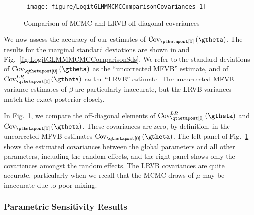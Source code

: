 \documentclass{article}\usepackage[]{graphicx}\usepackage[]{color}
\newenvironment{knitrout}{}{}
\theoremstyle{definition}
\theoremstyle{plain}
\theoremstyle{plain}
\theoremstyle{plain}
\theoremstyle{definition}
\theoremstyle{plain}
\theoremstyle{plain}
\newcommand{\fig}[1]{Fig.~\ref{fig:#1}}
\begin{document}
\begin{knitrout}
\color{fgcolor}\begin{figure}[t]

{\centering \texttt{[image: figure/LogitGLMMMCMCComparisonCovariances-1]} 

}

\caption[Comparison of MCMC and LRVB off-diagonal covariances]{Comparison of MCMC and LRVB off-diagonal covariances}\label{fig:LogitGLMMMCMCComparisonCovariances}
\end{figure}


\end{knitrout}
We now assess the accuracy of our estimates of $\pcov\left(\gtheta\right)$.
The results for the marginal standard deviations are shown in 
and \fig{LogitGLMMMCMCComparisonSds}. We refer to the standard deviations
of $\qcov\left(\gtheta\right)$ as the ``uncorrected MFVB'' estimate,
and of $\lrvbcov\left(\gtheta\right)$ as the ``LRVB'' estimate.
The uncorrected MFVB variance estimates of $\beta$ are particularly
inaccurate, but the LRVB variances match the exact posterior closely.

In \fig{LogitGLMMMCMCComparisonCovariances}, we compare the off-diagonal
elements of $\lrvbcov\left(\gtheta\right)$ and $\pcov\left(\gtheta\right)$.
These covariances are zero, by definition, in the uncorrected MFVB
estimates $\qcov\left(\gtheta\right)$. The left panel of \fig{LogitGLMMMCMCComparisonCovariances}
shows the estimated covariances between the global parameters and
all other parameters, including the random effects, and the right
panel shows only the covariances amongst the random effects. The LRVB
covariances are quite accurate, particularly when we recall that the MCMC
draws of $\mu$ may be inaccurate due to poor mixing.

\subsubsection{Parametric Sensitivity Results\label{subsec:glmm_sensitivity}}
\end{document}
